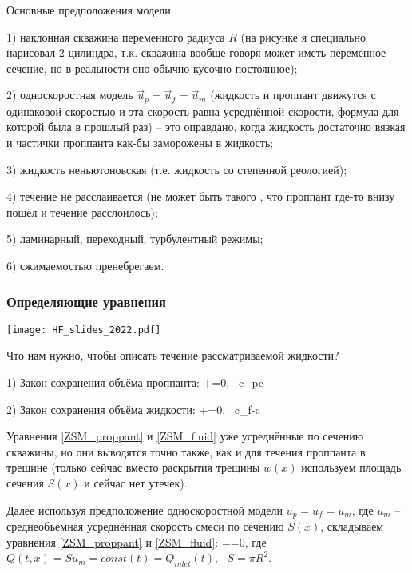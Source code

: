 \documentclass[main.tex]{subfiles}
\begin{document}
Основные предположения модели:

1) наклонная скважина переменного радиуса $R$ (на рисунке я специально нарисовал 2 цилиндра, т.к. скважина вообще говоря может иметь переменное сечение, но в реальности оно обычно кусочно постоянное);

2) односкоростная модель $\vec{u}_p=\vec{u}_f=\vec{u}_m$ (жидкость и проппант движутся с одинаковой скоростью и эта скорость равна усреднённой скорости, формула для которой была в прошлый раз) -- это оправдано, когда жидкость достаточно вязкая и частички проппанта как-бы заморожены в жидкость;

3) жидкость неньютоновская (т.е. жидкость со степенной реологией);

4) течение не расслаивается (не может быть такого , что проппант где-то внизу пошёл и течение расслоилось);

5) ламинарный, переходный, турбулентный режимы;

6) сжимаемостью пренебрегаем.
\\

\subsubsection{Определяющие уравнения}

\texttt{[image: HF\_slides\_2022.pdf]}

Что нам нужно, чтобы описать течение рассматриваемой жидкости?

1) Закон сохранения объёма проппанта:
\beq\label{ZSM_proppant}
+=0,\,\,\,\,\,c_p\equiv c
\eeq

2) Закон сохранения объёма жидкости:
\beq\label{ZSM_fluid}
+=0,\,\,\,\,\,c_f-c
\eeq

Уравнения \eqref{ZSM_proppant} и \eqref{ZSM_fluid} уже усреднённые по сечению скважины, но они выводятся точно также, как и для течения проппанта в трещине (только сейчас вместо раскрытия трещины $w(x)$ используем площадь сечения $S(x)$ и сейчас нет утечек).

Далее используя предположение односкоростной модели $u_p=u_f=u_m$, где $u_m$ -- среднеобъёмная усреднённая скорость смеси по сечению $S(x)$, складываем уравнения \eqref{ZSM_proppant} и \eqref{ZSM_fluid}:
\beq\label{Q_const_t}
==0,
\eeq
где $Q(t,x)=Su_m=const(t)=Q_{inlet}(t),\,\,\,\,S=\pi R^2$.
\end{document}
